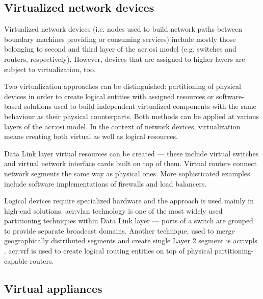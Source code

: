 \documentclass[11pt]{book}
\begin{document}
      \subsection{Virtualized network devices}

        Virtualized network devices (i.e. nodes used to build network paths between boundary machines providing or
        consuming services) include mostly those belonging to second and third layer of the \gls{acr:osi} model (e.g.
        switches and routers, respectively). However, devices that are assigned to higher layers are subject to
        virtualization, too.

        Two virtualization approaches can be distinguished: partitioning of physical devices in order to create logical
        entities with assigned resources or software-based solutions used to build independent virtualized components
        with the same behaviour as their physical counterparts. Both methods can be applied at various layers of the
        \gls{acr:osi} model. In the context of network devices, virtualization means creating both virtual as well as
        logical resources.

        Data Link layer virtual resources can be created --- these include virtual switches and virtual network
        interface cards built on top of them. Virtual routers connect network segments the same way as physical ones.
        More sophisticated examples include software implementations of firewalls and load balancers.

        Logical devices require specialized hardware and the approach is used mainly in high-end solutions.
        \gls{acr:vlan} technology is one of the most widely used partitioning techniques within Data Link layer ---
        ports of a switch are grouped to provide separate broadcast domains. Another technique, used to merge
        geographically distributed segments and create single Layer 2 segment is \gls{acr:vpls} \cite{moreno}.
        \gls{acr:vrf} is used to create logical routing entities on top of physical partitioning-capable routers.




      \subsection{Virtual appliances}
      \label{sub:}
\end{document}
